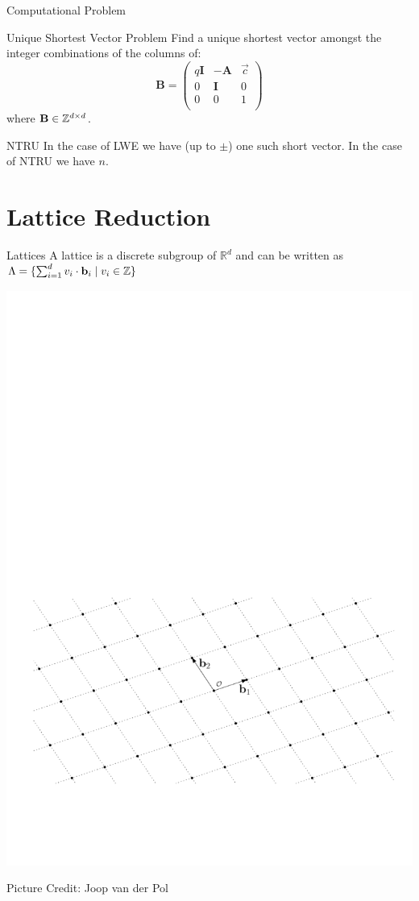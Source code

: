 \documentclass[xcolor=table,10pt,aspectratio=169]{beamer}
\begin{document}
\begin{frame}[label={sec:orge896f7c}]{Computational Problem}
\begin{block}{Unique Shortest Vector Problem}
Find a unique shortest vector amongst the integer combinations of the columns of:
\[
  \mathbf{B} = \begin{pmatrix}
    q\mathbf{I} & -\mathbf{A} & \vec{c}\\
    0 & \mathbf{I} & 0\\
    0 & 0 & 1\\
  \end{pmatrix}
\]
where \(\mathbf{B} \in \mathbb{Z}^{d \times d}\).

\pause
\end{block}

\begin{alertblock}{NTRU}
In the case of LWE we have (up to \(\pm\)) one such short vector. In the case of NTRU we have \(n\).
\end{alertblock}
\end{frame}

\section{Lattice Reduction}
\label{sec:org39254a9}
\begin{frame}[label={sec:org52bcfb9}]{Lattices}
A lattice is a discrete subgroup of \(\mathbb{R}^d\) and can be written as \(\Lambda = \{\sum_{i=1}^{d} v_i \cdot \mathbf{b}_i \mid v_i \in \mathbb{Z}\}\)

\begin{center}
\includegraphics[width=0.8\linewidth]{./joop-latt1.pdf}
\end{center}

\tiny Picture Credit: Joop van der Pol
\end{frame}
\end{document}
